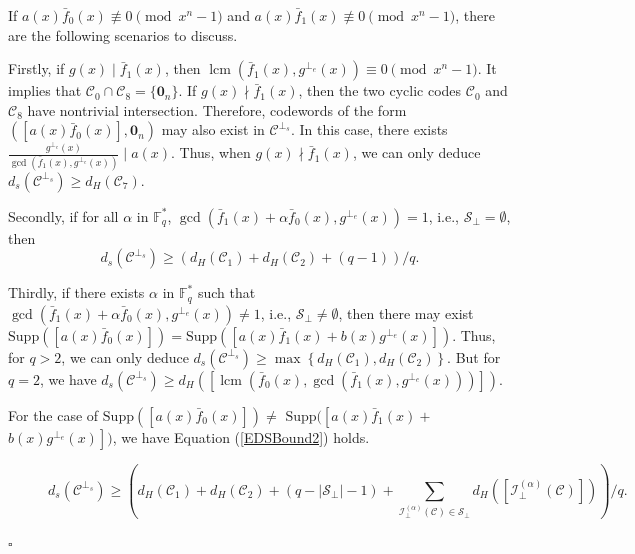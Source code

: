 \documentclass[journal]{IEEEtran}
\newenvironment{proof}{{\noindent\it Proof:} }{\hfill $\square$\par}
\begin{document}
\begin{proof}
	
  
 If $a(x)\bar{f}_0(x)\not\equiv 0 \pmod{x^n-1}$ and $a(x)\bar{f}_1(x) \not\equiv 0 \pmod{x^n-1}$, there are the following scenarios to discuss. 

	Firstly,  if $g(x)\mid \bar{f}_1(x)$, then $\operatorname{lcm}(\bar{f}_1(x),g^{\perp_e}(x))\equiv 0 \pmod{x^n-1}$. 
 It implies that $\mathscr{C}_0\cap \mathscr{C}_8=\{ \mathbf{0}_{n}\}$. 
	 If $g(x)\nmid \bar{f}_1(x)$, then the two cyclic codes $\mathscr{C}_0$ and $\mathscr{C}_8$ have nontrivial intersection.
 Therefore, codewords of the form $(\left[a(x)\bar{f}_0(x)\right],\mathbf{0}_n)$ may also exist in $\mathscr{C}^{\perp_s}$. 
 In this case, there exists $\frac{g^{\perp_{e}}(x)}{\gcd(\bar{f}_1(x),g^{\perp_{e}}(x))} \mid a(x)$. Thus, when $g(x)\nmid \bar{f}_1(x)$, we can only deduce $d_s(\mathscr{C}^{\perp_s})\ge d_H(\mathscr{C}_7)$. 
	
	Secondly, if for all $ \alpha  $ in $\mathbb{F}_q^*$, $\gcd(\bar{f}_1(x)+\alpha   \bar{f}_0(x),g^{\perp_{e}}(x))= 1$, i.e., $\mathcal{S}_{\perp} =\emptyset$, then 
	\begin{equation}\label{EDSBound1}
		d_s(\mathscr{C}^{\perp_s})\ge \left(d_H(\mathscr{C}_1)+d_H(\mathscr{C}_2)+(q-1) \right)/ q.
	\end{equation}
	
	Thirdly, if there exists $\alpha  $ in $\mathbb{F}_q^*$ such that  $\gcd(\bar{f}_1(x)+\alpha   \bar{f}_0(x),g^{\perp_{e}}(x))\ne 1$, i.e., $\mathcal{S}_{\perp} \ne\emptyset$, then there may exist $\mathrm{Supp}(\left[a(x)\bar{f}_0(x)\right]) =\mathrm{Supp}(\left[a(x)\bar{f}_1(x)+b(x)g^{\perp_{e}}(x)\right])$.
	Thus, for $q>2$, we can only deduce $d_s(\mathscr{C}^{\perp_s})\ge \max\left\{ d_H(\mathscr{C}_1),d_H(\mathscr{C}_2) \right\}$.
	But for $q=2$, we have
	$d_s(\mathscr{C}^{\perp_s})\ge d_H( \left[ \operatorname{lcm}(\bar{f}_0(x),\gcd(\bar{f}_1(x),g^{\perp_{e}}(x))) \right])$. 
	
	For the case of $\mathrm{Supp}(\left[a(x)\bar{f}_0(x)\right])\ne$ 
	$ \mathrm{Supp}(\left[a(x)\bar{f}_1(x)+\right. $ $\left.b(x)g^{\perp_{e}}(x)\right])$,
	we have Equation (\ref{EDSBound2}) holds.
	

	
	 \begin{figure}
	\begin{equation}\label{EDSBound2}
		d_s(\mathscr{C}^{\perp_s})\ge \left(d_H(\mathscr{C}_1)+d_H(\mathscr{C}_2)+(q-|\mathcal{S}_{\perp} |-1)+\sum\limits_{\mathcal{I}^{(\alpha)}_{\perp}(\mathscr{C})\in \mathcal{S}_{\perp} } d_H\left(\left[ \mathcal{I}^{(\alpha)}_{\perp}(\mathscr{C}) \right]\right)\right)/ q.
	\end{equation} \end{figure} 
	

\end{proof}
\end{document}
